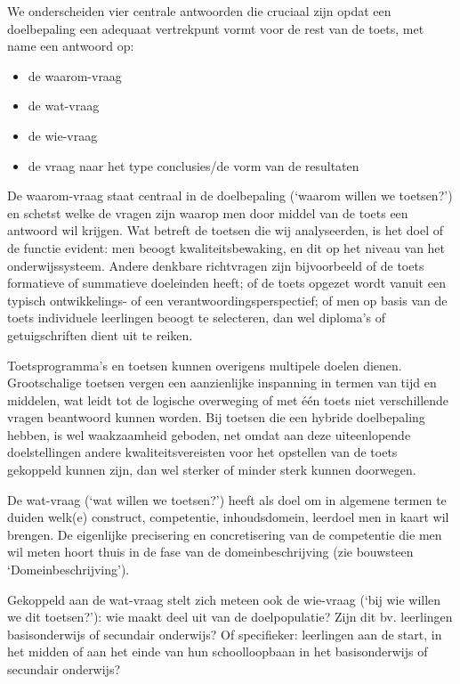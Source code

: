 \documentclass[
  letterpaper,
]{report}
\providecommand{\tightlist}{%
  \setlength{\itemsep}{0pt}\setlength{\parskip}{0pt}}
\begin{document}
We onderscheiden vier centrale antwoorden die cruciaal zijn opdat een
doelbepaling een adequaat vertrekpunt vormt voor de rest van de toets,
met name een antwoord op:

\begin{itemize}
\tightlist
\item
  de waarom-vraag
\item
  de wat-vraag
\item
  de wie-vraag
\item
  de vraag naar het type conclusies/de vorm van de resultaten
\end{itemize}

De waarom-vraag staat centraal in de doelbepaling (`waarom willen we
toetsen?') en schetst welke de vragen zijn waarop men door middel van de
toets een antwoord wil krijgen. Wat betreft de toetsen die wij
analyseerden, is het doel of de functie evident: men beoogt
kwaliteitsbewaking, en dit op het niveau van het onderwijssysteem.
Andere denkbare richtvragen zijn bijvoorbeeld of de toets formatieve of
summatieve doeleinden heeft; of de toets opgezet wordt vanuit een
typisch ontwikkelings- of een verantwoordingsperspectief; of men op
basis van de toets individuele leerlingen beoogt te selecteren, dan wel
diploma's of getuigschriften dient uit te reiken.

Toetsprogramma's en toetsen kunnen overigens multipele doelen dienen.
Grootschalige toetsen vergen een aanzienlijke inspanning in termen van
tijd en middelen, wat leidt tot de logische overweging of met één toets
niet verschillende vragen beantwoord kunnen worden. Bij toetsen die een
hybride doelbepaling hebben, is wel waakzaamheid geboden, net omdat aan
deze uiteenlopende doelstellingen andere kwaliteitsvereisten voor het
opstellen van de toets gekoppeld kunnen zijn, dan wel sterker of minder
sterk kunnen doorwegen.

De wat-vraag (`wat willen we toetsen?') heeft als doel om in algemene
termen te duiden welk(e) construct, competentie, inhoudsdomein, leerdoel
men in kaart wil brengen. De eigenlijke precisering en concretisering
van de competentie die men wil meten hoort thuis in de fase van de
domeinbeschrijving (zie bouwsteen `Domeinbeschrijving').

Gekoppeld aan de wat-vraag stelt zich meteen ook de wie-vraag (`bij wie
willen we dit toetsen?'): wie maakt deel uit van de doelpopulatie? Zijn
dit bv. leerlingen basisonderwijs of secundair onderwijs? Of
specifieker: leerlingen aan de start, in het midden of aan het einde van
hun schoolloopbaan in het basisonderwijs of secundair onderwijs?
\end{document}
